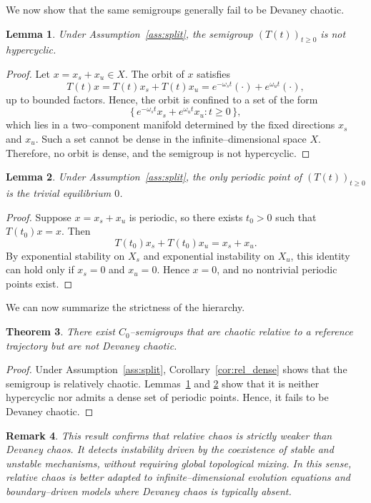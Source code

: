 \documentclass[12pt]{article}
\newtheorem{theorem}{Theorem}[section]
\newtheorem{lemma}[theorem]{Lemma}
\newtheorem{remark}[theorem]{Remark}
\begin{document}
We now show that the same semigroups generally fail to be Devaney chaotic.

\begin{lemma}\label{lem:no_hypercyclic}
Under Assumption~\ref{ass:split}, the semigroup $(T(t))_{t\ge 0}$ is not hypercyclic.
\end{lemma}

\begin{proof}
Let $x=x_s+x_u\in X$. The orbit of $x$ satisfies
\[
T(t)x = T(t)x_s + T(t)x_u
= e^{-\omega_s t}(\cdot) + e^{\omega_u t}(\cdot),
\]
up to bounded factors. Hence, the orbit is confined to a set of the form
\[
\{\,e^{-\omega_s t}x_s + e^{\omega_u t}x_u : t\ge 0\,\},
\]
which lies in a two--component manifold determined by the fixed directions $x_s$ and $x_u$. Such a set cannot be dense in the infinite--dimensional space $X$. Therefore, no orbit is dense, and the semigroup is not hypercyclic.
\end{proof}

\begin{lemma}\label{lem:no_periodic}
Under Assumption~\ref{ass:split}, the only periodic point of $(T(t))_{t\ge 0}$ is the trivial equilibrium $0$.
\end{lemma}

\begin{proof}
Suppose $x=x_s+x_u$ is periodic, so there exists $t_0>0$ such that
$T(t_0)x=x$. Then
\[
T(t_0)x_s + T(t_0)x_u = x_s + x_u.
\]
By exponential stability on $X_s$ and exponential instability on $X_u$, this identity can hold only if $x_s=0$ and $x_u=0$. Hence $x=0$, and no nontrivial periodic points exist.
\end{proof}

We can now summarize the strictness of the hierarchy.

\begin{theorem}\label{thm:strictness}
There exist $C_0$--semigroups that are chaotic relative to a reference trajectory but are not Devaney chaotic.
\end{theorem}

\begin{proof}
Under Assumption~\ref{ass:split}, Corollary~\ref{cor:rel_dense} shows that the semigroup is relatively chaotic.
Lemmas~\ref{lem:no_hypercyclic} and
\ref{lem:no_periodic} show that it is neither hypercyclic nor admits a dense set of periodic points. Hence, it fails to be Devaney chaotic.
\end{proof}

\begin{remark}
This result confirms that relative chaos is strictly weaker than Devaney chaos. It detects instability driven by the coexistence of stable and unstable mechanisms, without requiring global topological mixing. In this sense, relative chaos is better adapted to infinite--dimensional evolution equations and boundary--driven models where Devaney chaos is typically absent.
\end{remark}
\end{document}

